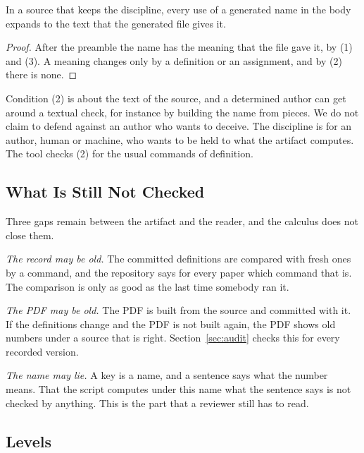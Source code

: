 \documentclass[acmsmall,nonacm,screen]{acmart}
\begin{document}
\begin{proposition}
\label{prop:discipline}
In a source that keeps the discipline, every use of a generated name in the body expands to
the text that the generated file gives it.
\end{proposition}

\begin{proof}
After the preamble the name has the meaning that the file gave it, by (1) and (3). A meaning
changes only by a definition or an assignment, and by (2) there is none.
\end{proof}

Condition (2) is about the text of the source, and a determined author can get around a
textual check, for instance by building the name from pieces. We do not claim to defend
against an author who wants to deceive. The discipline is for an author, human or machine,
who wants to be held to what the artifact computes. The tool checks (2) for the usual
commands of definition.

\subsection{What Is Still Not Checked}

Three gaps remain between the artifact and the reader, and the calculus does not close them.

\emph{The record may be old.} The committed definitions are compared with fresh ones by a
command, and the repository says for every paper which command that is. The comparison is
only as good as the last time somebody ran it.

\emph{The PDF may be old.} The PDF is built from the source and committed with it. If the
definitions change and the PDF is not built again, the PDF shows old numbers under a source
that is right. Section~\ref{sec:audit} checks this for every recorded version.

\emph{The name may lie.} A key is a name, and a sentence says what the number means. That
the script computes under this name what the sentence says is not checked by anything. This
is the part that a reviewer still has to read.

\subsection{Levels}
\label{sec:levels}
\end{document}

